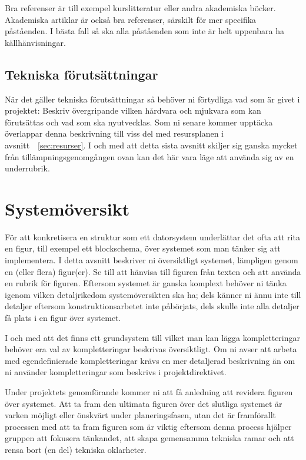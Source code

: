 \documentclass[a4paper]{article}
\begin{document}
Bra referenser är till exempel kurslitteratur eller andra akademiska
böcker. Akademiska artiklar är också bra referenser, särskilt för mer
specifika påståenden. I bästa fall så ska alla påståenden som inte är
helt uppenbara ha källhänvisningar.


\subsection {Tekniska förutsättningar}

När det gäller tekniska förutsättningar så behöver ni förtydliga vad som
är givet i projektet: Beskriv övergripande vilken hårdvara och mjukvara
som kan förutsättas och vad som ska nyutvecklas. Som ni senare kommer
upptäcka överlappar denna beskrivning till viss del med resursplanen i
avsnitt ~\ref{sec:resurser}. I och med att detta sista avsnitt skiljer sig
ganska mycket från tillämpningsgenomgången ovan kan det här vara läge
att använda sig av en underrubrik.



\section {Systemöversikt}


För att konkretisera en struktur som ett datorsystem underlättar det
ofta att rita en figur, till exempel ett blockschema, över systemet som
man tänker sig att implementera. I detta avsnitt beskriver ni
översiktligt systemet, lämpligen genom en (eller flera) figur(er). Se
till att hänvisa till figuren från texten och att använda en rubrik för
figuren. Eftersom systemet är ganska komplext behöver ni tänka igenom
vilken detaljrikedom systemöversikten ska ha; dels känner ni ännu inte
till detaljer eftersom konstruktionsarbetet inte påbörjats, dels skulle
inte alla detaljer få plats i en figur över systemet.

I och med att det finns ett grundsystem till vilket man kan lägga
kompletteringar behöver era val av kompletteringar beskrivas
översiktligt. Om ni avser att arbeta med egendefinierade kompletteringar
krävs en mer detaljerad beskrivning än om ni använder kompletteringar
som beskrivs i projektdirektivet.

Under projektets genomförande kommer ni att få anledning att revidera
figuren över systemet. Att ta fram den ultimata figuren över det
slutliga systemet är varken möjligt eller önskvärt under
planeringsfasen, utan det är framförallt processen med att ta fram
figuren som är viktig eftersom denna process hjälper gruppen att
fokusera tänkandet, att skapa gemensamma tekniska ramar och att rensa
bort (en del) tekniska oklarheter.
\end{document}

